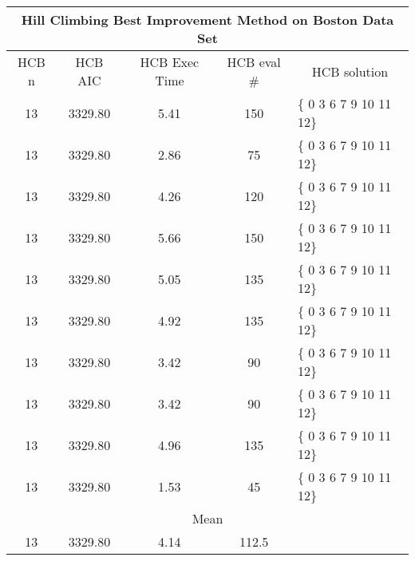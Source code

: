 \begin{tabular}{|c|c|c|c|l|}
	\hline
	\multicolumn{5}{|c|}{Hill Climbing Best Improvement Method on Boston Data Set}                       \\ \hline
	HCB n & HCB AIC    & HCB Exec Time & HCB eval \# & \multicolumn{1}{c|}{HCB solution} \\ \hline
	13    & 3329.80 & 5.41              & 150                    & \{ 0 3 6 7 9 10 11 12\}           \\ \hline
	13    & 3329.80 & 2.86              & 75                     & \{ 0 3 6 7 9 10 11 12\}           \\ \hline
	13    & 3329.80 & 4.26              & 120                    & \{ 0 3 6 7 9 10 11 12\}           \\ \hline
	13    & 3329.80 & 5.66              & 150                    & \{ 0 3 6 7 9 10 11 12\}           \\ \hline
	13    & 3329.80 & 5.05              & 135                    & \{ 0 3 6 7 9 10 11 12\}           \\ \hline
	13    & 3329.80 & 4.92              & 135                    & \{ 0 3 6 7 9 10 11 12\}           \\ \hline
	13    & 3329.80 & 3.42              & 90                     & \{ 0 3 6 7 9 10 11 12\}           \\ \hline
	13    & 3329.80 & 3.42              & 90                     & \{ 0 3 6 7 9 10 11 12\}           \\ \hline
	13    & 3329.80 & 4.96              & 135                    & \{ 0 3 6 7 9 10 11 12\}           \\ \hline
	13    & 3329.80 & 1.53              & 45                     & \{ 0 3 6 7 9 10 11 12\}           \\ \hline
	\multicolumn{5}{|c|}{Mean}                                                                           \\ \hline
	13    & 3329.80 & 4.14             & 112.5                  &                                   \\ \hline
\end{tabular}

